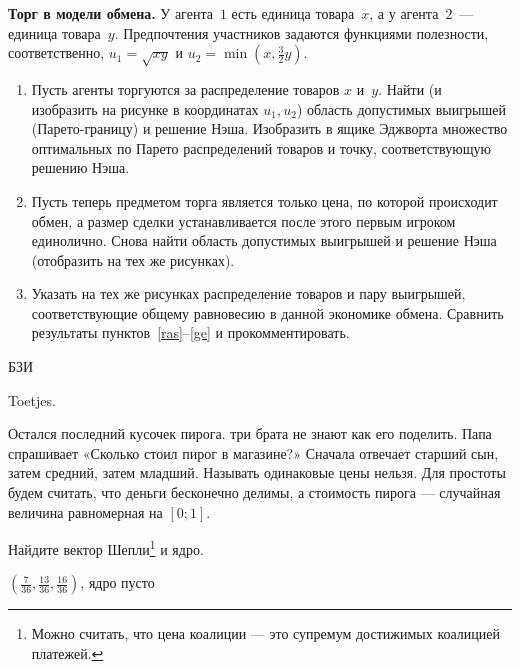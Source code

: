 \begin{problem}

{\bf Торг в модели обмена.} У агента~$1$ есть единица
товара~$x$, а у агента~$2$~--- единица товара~$y$.
Предпочтения участников задаются функциями полезности,
соответственно, $u_1=\sqrt{xy}$ и
$u_2=\min\left(x,\frac{3}{2}y\right)$.

\begin{enumerate}

\item\label{ras} Пусть агенты торгуются за распределение
товаров $x$ и~$y$. Найти (и изобразить на рисунке в
координатах $u_1,u_2$) область допустимых выигрышей
(Парето-границу) и решение Нэша. Изобразить в ящике
Эджворта множество оптимальных по Парето распределений
товаров и точку, соответствующую решению Нэша.

\item\label{p} Пусть теперь предметом торга является только
цена, по которой происходит обмен, а размер сделки
устанавливается после этого первым игроком единолично.
Снова найти область допустимых выигрышей и решение Нэша
(отобразить на тех же рисунках).

\item\label{ge} Указать на тех же рисунках распределение
товаров и пару выигрышей, соответствующие общему равновесию
в данной экономике обмена. Сравнить результаты
пунктов~\ref{ras}--\ref{ge} и прокомментировать.

\end{enumerate}




\begin{source}
БЗИ
\end{source}


\begin{sol}

\end{sol}
\end{problem}




\begin{problem}
Toetjes.

Остался последний кусочек пирога. три брата не знают как его поделить. Папа спрашивает «Сколько стоил пирог в магазине?» Сначала отвечает старший сын, затем средний, затем младший. Называть одинаковые цены нельзя. Для простоты будем считать, что деньги бесконечно делимы, а стоимость пирога — случайная величина равномерная на $[0;1]$.

Найдите вектор Шепли\footnote{Можно считать, что цена коалиции — это супремум достижимых коалицией платежей.} и ядро.



\begin{source}
\cite{ferguson:tn}
\end{source}


\begin{sol}
$\left(\frac{7}{36},\frac{13}{36},\frac{16}{36}\right)$, ядро пусто
\end{sol}
\end{problem}



